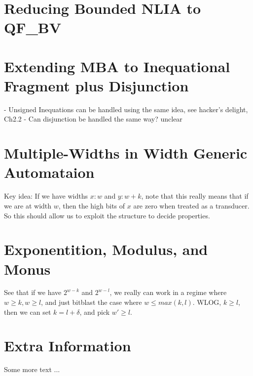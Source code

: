 \documentclass[withindex,glossary]{cam-thesis}
\begin{document}
\chapter{Reducing Bounded NLIA to QF\_BV}

\chapter{Extending MBA to Inequational Fragment plus Disjunction}

- Unsigned Inequations can be handled using the same idea, see hacker's delight, Ch2.2
- Can disjunction be handled the same way? unclear

\chapter{Multiple-Widths in Width Generic Automataion}

Key idea: If we have widths $x : w$ and $ y : w+k$, note that this really means that
if we are at width $w$, then the high bits of $x$ are zero when treated as a transducer.
So this should allow us to exploit the structure to decide properties.

\chapter{Exponentition, Modulus, and Monus}

See that if we have $2^{w-k}$ and $2^{w - l}$, we really can work in a regime where $w \geq k, w \geq l$,
and just bitblast the case where $w \leq max(k, l)$.
WLOG, $k \geq l$, then we can set $k = l + \delta$, and pick $w' \geq l$.



%

\renewcommand{\bibname}{References}
\cleardoublepage
{}
{}






\appendix

\chapter{Extra Information}
Some more text ...



\printthesisindex
\end{document}
